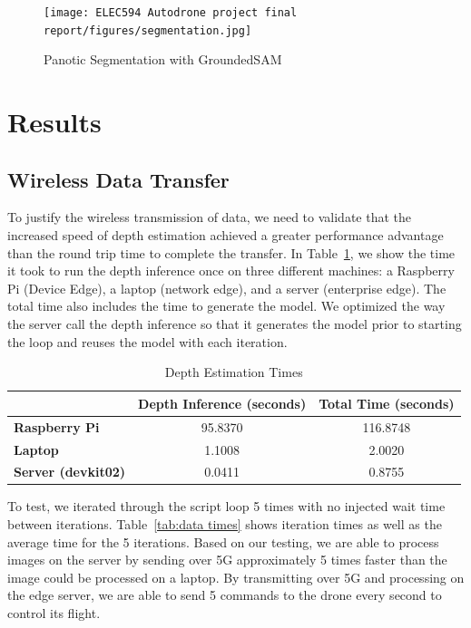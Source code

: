\documentclass[conference]{IEEEtran}
\begin{document}
\begin{figure}[h]
    \centering
    \texttt{[image: ELEC594 Autodrone project final report/figures/segmentation.jpg]}
    \caption{Panotic Segmentation with GroundedSAM}
    \label{fig:segmentation}
\end{figure}

\section{Results}
\subsection{Wireless Data Transfer}
To justify the wireless transmission of data, we need to validate that the increased speed of depth estimation achieved a greater performance advantage than the round trip time to complete the transfer. In Table~\ref{tab:depth times}, we show the time it took to run the depth inference once on three different machines: a Raspberry Pi (Device Edge), a laptop (network edge), and a server (enterprise edge). The total time also includes the time to generate the model. We optimized the way the server call the depth inference so that it generates the model prior to starting the loop and reuses the model with each iteration.

\begin{table}[h]
\centering
\caption{Depth Estimation Times}
\label{tab:depth times}
\begin{tabular}{lcc}
\toprule
 & \textbf{Depth Inference (seconds)} & \textbf{Total Time (seconds)} \\ \midrule
\textbf{Raspberry Pi} & 95.8370 & 116.8748\\
\textbf{Laptop} & 1.1008 & 2.0020  \\
\textbf{Server (devkit02)} & 0.0411 & 0.8755  \\ 
\bottomrule
\end{tabular}
\end{table}

To test, we iterated through the script loop 5 times with no injected wait time between iterations. Table~\ref{tab:data times} shows iteration times as well as the average time for the 5 iterations. Based on our testing, we are able to process images on the server by sending over 5G approximately 5 times faster than the image could be processed on a laptop. By transmitting over 5G and processing on the edge server, we are able to send 5 commands to the drone every second to control its flight. 
\end{document}
